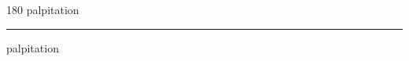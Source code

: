 
\begin{frame}
\begin{center}
\begin{turn}{180}
{\fontsize{2.5cm}{1em}\selectfont palpitation}
\end{turn}
\vspace{1em}\par  
\hrule
\vspace{1em}\par  
{\fontsize{2.5cm}{1em}\selectfont palpitation}
\end{center}
\end{frame}
